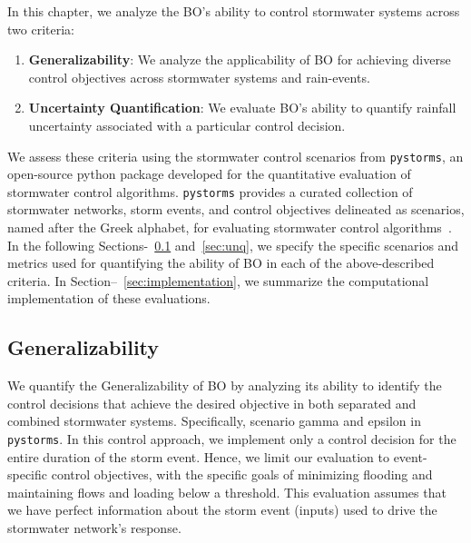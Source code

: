In this chapter, we analyze the BO's ability to control stormwater systems across two criteria:%
\begin{enumerate}
	\item \textbf{Generalizability}: We analyze the applicability of BO for achieving diverse control objectives across stormwater systems and rain-events.
	\item \textbf{Uncertainty Quantification}: We evaluate BO's ability to quantify rainfall uncertainty associated with a particular control decision.
\end{enumerate}
We assess these criteria using the stormwater control scenarios from \texttt{pystorms}, an open-source python package developed for the quantitative evaluation of stormwater control algorithms.
\texttt{pystorms} provides a curated collection of stormwater networks, storm events, and control objectives delineated as scenarios, named after the Greek alphabet, for evaluating stormwater control algorithms~\cite{Rimer2019}.
In the following Sections-~\ref{sec:general} and~\ref{sec:unq}, we specify the specific scenarios and metrics used for quantifying the ability of BO in each of the above-described criteria.
In Section--~\ref{sec:implementation}, we summarize the computational implementation of these evaluations.

\subsection{Generalizability}\label{sec:general}
We quantify the Generalizability of BO by analyzing its ability to identify the control decisions that achieve the desired objective in both separated and combined stormwater systems.
Specifically, scenario gamma and epsilon in \texttt{pystorms}.
In this control approach, we implement only a control decision for the entire duration of the storm event. Hence, we limit our evaluation to event-specific control objectives, with the specific goals of minimizing flooding and maintaining flows and loading below a threshold.
This evaluation assumes that we have perfect information about the storm event (inputs) used to drive the stormwater network's response.

